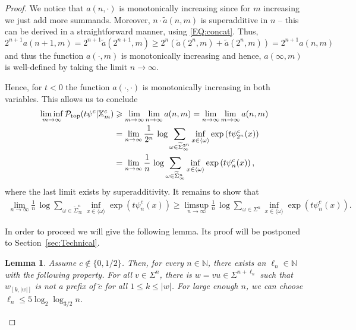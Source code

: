 \documentclass[11pt,reqno]{amsart}
\theoremstyle{plain}
\newtheorem{lemma}[theorem]{Lemma}
\theoremstyle{definition}
\newcommand{\N}{{\mathbb N}}
\begin{document}
\begin{proof}
 
 
 We notice that $a(n, \cdot)$ is monotonically increasing since for $m$ increasing we just add more summands.
  Moreover, $n \cdot \widetilde{a}(n, m)$ is superadditive in $n$ -- this can be derived in a straightforward manner, using \eqref{EQ:concat}.  
  Thus, 
  $$2^{n+1} a(n+1,m)= 2^{n+1} \widetilde{a}(2^{n+1},m)\geqslant 2^{n} (\widetilde{a}(2^n,m)+\widetilde{a}(2^n,m))= 2^{n+1} a(n,m)$$ 
  and thus the function $a(\cdot, m)$ is monotonically increasing and hence, $a(\infty, m)$ is well-defined by taking the limit $n\to\infty$.
  
Hence, for $t < 0$ the function $a(\cdot,\cdot)$ is monotonically increasing in both variables. This allows us to conclude
\begin{align}
  \liminf_{m \to \infty} \mathcal{P}_{\operatorname{top}}(t\psi^{c} \vert \mathbb{X}_m^{c})
&\geqslant \lim_{m \to \infty} \lim_{n \to \infty} a(n,m)
=\lim_{n \to \infty} \lim_{m \to \infty} a(n,m)\notag\\
&=\lim_{n \to \infty} \frac{1}{2^n}\, \log \sum_{\omega\in \widetilde \Sigma_{\infty}^{2^n}}\inf_{x\in  \langle\omega\rangle}\exp\left(t \psi_{2^n}^{c}(x)\right)\notag\\
&=\lim_{n \to \infty} \frac{1}{n}\, \log \sum_{\omega\in \widetilde \Sigma_{\infty}^{n}}\inf_{x\in  \langle\omega\rangle}\exp\left(t \psi_{n}^{c}(x)\right),\label{eq: lim m Ptop}
\end{align}
where the last limit exists by superadditivity.
It remains to show that 
\begin{align*}
 \lim_{n \to \infty} \frac{1}{n}\, \log \sum_{\omega\in \widetilde \Sigma_{\infty}^{n}}\inf_{x\in  \langle\omega\rangle}\exp\left(t \psi_{n}^{c}(x)\right)
  \geqslant \limsup_{n \to \infty} \frac{1}{n}\, \log \sum_{\omega\in \Sigma^{n}}\inf_{x\in  \langle\omega\rangle}\exp\left(t \psi_{n}^{c}(x)\right).
\end{align*}

In order to proceed we will give the following lemma. Its proof will be postponed to Section~\ref{sec:Technical}.
\begin{lemma}
\label{LEM:sliding-out-no-prefix}
Assume $c \notin \{0,1/2\}$. Then, for every $n\in\N$, there exists an $\ell_n \in \N$ with the following property. For all $v \in \Sigma^n$, there is $w = v u \in \Sigma^{n + \ell_n}$ such that $w_{[k,|w|]}$ is not a prefix of $\breve{c}$ for all $1\leqslant k \leqslant |w|$. For large enough $n$, we can choose $\ell_n\leqslant 5 \log_2 \log_{3/2} n$.
\end{lemma}




\end{proof}
\end{document}
